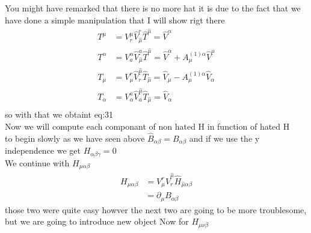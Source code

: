 \documentclass{article}
\begin{document}
You might have remarked that there is no more hat it is due to the fact that we have done a simple manipulation that I will show rigt there
\begin{subequations}
    \begin{align}
        T^{\mu} &= V_r^\mu \hat V^r_{\hat \mu}\hat T^{\hat \mu} = \hat V^\alpha  \\
        T^{\alpha} &= V_a^\alpha \hat V^a_{\hat \mu}\hat T^{\hat \mu}= \hat V^\alpha + A^{(1)\alpha}_\mu \hat V^\mu \\
        T_{\mu} &= V_\mu^r \hat V_r^{\hat \mu}\hat T_{\hat \mu} = \hat V_\mu - A^{(1)\alpha}_\mu\hat V_\alpha\\
        T_{\alpha} &= V_\alpha^a \hat V_a^{\hat \mu}\hat T_{\hat \mu} = \hat V_\alpha \\
    \end{align}
\end{subequations}
so with that we obtaint {eq:31}\\
Now we will compute each componant of non hated H in function of hated H\\
to begin slowly as we have seen above $\hat B_{\alpha \beta} = B_{\alpha \beta} $ and if we use the y independence we get $H_{\alpha \beta \gamma} = 0$\\
We continue with $H_{\mu \alpha \beta}$
\begin{equation}
    \begin{aligned}
        H_{\mu \alpha \beta} &= V^r_\mu  \hat V^{\hat \mu}_r \hat H_{\hat \mu \alpha \beta }\\
        & = \partial_\mu B_{\alpha \beta}
    \end{aligned}
\end{equation}
those two were quite easy howver the next two are going to be more troublesome, but we are going to introduce new object
Now for $H_{\mu \nu \beta}$
\end{document}
